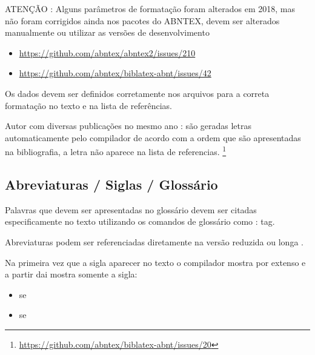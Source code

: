 ATENÇÃO : Alguns parâmetros de formatação foram alterados em 2018, mas não foram corrigidos ainda nos pacotes do ABNTEX, devem ser alterados manualmente ou utilizar as versões de desenvolvimento
\begin{itemize}
    \item \url{https://github.com/abntex/abntex2/issues/210}
    \item \url{https://github.com/abntex/biblatex-abnt/issues/42}
\end{itemize}

Os dados devem ser definidos corretamente nos arquivos  para a correta formatação no texto e na lista de referências.

Autor com diversas publicações no mesmo ano : são geradas letras automaticamente pelo compilador de acordo com a ordem que são apresentadas na bibliografia, a letra não aparece na lista de referencias. \footnote{\url{https://github.com/abntex/biblatex-abnt/issues/20}}


\subsection{Abreviaturas / Siglas / Glossário}

Palavras que devem ser apresentadas no glossário devem ser citadas especificamente no texto utilizando os comandos de glossário como : \gls{tag}.

Abreviaturas podem ser referenciadas diretamente na versão reduzida  \space  
ou longa .

Na primeira vez que a sigla aparecer no texto o compilador mostra por extenso e a partir dai mostra somente a sigla:

\begin{itemize}
    \item \gls{se}
    \item \gls{se}
\end{itemize}






